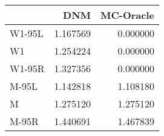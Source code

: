 \begin{tabular}{lrr}
\toprule
{} &       DNM &  MC-Oracle \\
\midrule
W1-95L &  1.167569 &   0.000000 \\
W1     &  1.254224 &   0.000000 \\
W1-95R &  1.327356 &   0.000000 \\
M-95L  &  1.142818 &   1.108180 \\
M      &  1.275120 &   1.275120 \\
M-95R  &  1.440691 &   1.467839 \\
\bottomrule
\end{tabular}

